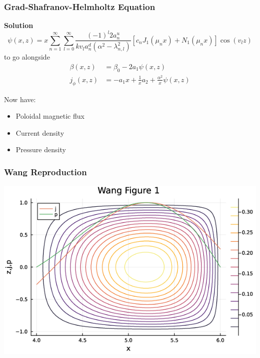 \documentclass{beamer}
\begin{document}
\begin{frame}
\frametitle{Grad-Shafranov-Helmholtz Equation}

\textbf{Solution}
\begin{equation*}
    \psi(x,z) = x \sum_{n = 1}^{\infty} \sum_{l = 0}^{\infty} \frac{(-1)^l 2 a_n^u}{kv_la_n^d (\alpha^2 - \lambda_{n,l}^2)} \left [ c_n J_1(\mu_n x) + N_1(\mu_n x)\right ] \cos(v_l z)
\end{equation*}
to go alongside
\begin{align*}
    \beta(x, z) &= \beta_0 - 2a_1 \psi(x, z) \\
    j_{\phi}(x,z) &= -a_1 x + \frac{1}{x} a_2 + \frac{\alpha^2}{x} \psi(x, z)
\end{align*}

Now have:
\begin{itemize}
    \item Poloidal magnetic flux 
    \item Current density
    \item Pressure density
\end{itemize}

\end{frame}














\begin{frame}
\frametitle{Wang Reproduction}

\centering
\includegraphics[scale=0.5]{imgs/wang-fig-1.png}

\end{frame}
\end{document}
